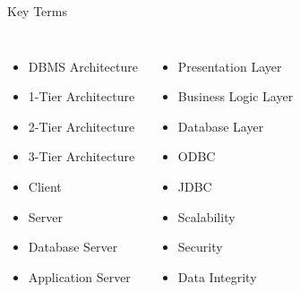 \documentclass[aspectratio=169,11pt]{beamer}
\newcommand{\tightlist}{\setlength{\itemsep}{2pt}\setlength{\parskip}{0pt}}
\begin{document}
\begin{frame}{Key Terms}
\small
\begin{columns}[T]
\begin{itemize}\tightlist
  \item DBMS Architecture
  \item 1-Tier Architecture
  \item 2-Tier Architecture
  \item 3-Tier Architecture
  \item Client
  \item Server
  \item Database Server
  \item Application Server
\end{itemize}

\begin{itemize}\tightlist
  \item Presentation Layer
  \item Business Logic Layer
  \item Database Layer
  \item ODBC
  \item JDBC
  \item Scalability
  \item Security
  \item Data Integrity
\end{itemize}
\end{columns}
\end{frame}
\end{document}
